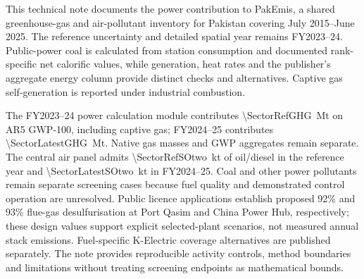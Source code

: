 This technical note documents the power contribution to PakEmis, a shared greenhouse-gas and air-pollutant inventory for Pakistan covering July 2015--June 2025. The reference uncertainty and detailed spatial year remains FY2023--24. Public-power coal is calculated from station consumption and documented rank-specific net calorific values, while generation, heat rates and the publisher's aggregate energy column provide distinct checks and alternatives. Captive gas self-generation is reported under industrial combustion.

The FY2023--24 power calculation module contributes \SI{\SectorRefGHG}{\mega\tonne} \COe{} on AR5 GWP-100, including captive gas; FY2024--25 contributes \SI{\SectorLatestGHG}{\mega\tonne}. Native gas masses and GWP aggregates remain separate. The central air panel admits \SI{\SectorRefSOtwo}{\kilo\tonne} of oil/diesel \SOtwo{} in the reference year and \SI{\SectorLatestSOtwo}{\kilo\tonne} in FY2024--25. Coal and other power pollutants remain separate screening cases because fuel quality and demonstrated control operation are unresolved. Public licence applications establish proposed 92\% and 93\% flue-gas desulfurisation at Port Qasim and China Power Hub, respectively; these design values support explicit selected-plant scenarios, not measured annual stack emissions. Fuel-specific K-Electric coverage alternatives are published separately. The note provides reproducible activity controls, method boundaries and limitations without treating screening endpoints as mathematical bounds.
